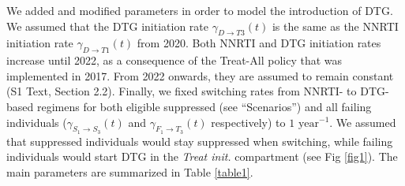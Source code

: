 \documentclass[10pt,letterpaper]{article}
\begin{document}
We added and modified parameters in order to model the introduction of DTG. We assumed that the DTG initiation rate $\gamma_{D\rightarrow T3}^{}(t)$ is the same as the NNRTI initiation rate $\gamma_{D\rightarrow T1}^{}(t)$ from 2020. Both NNRTI and DTG initiation rates increase until 2022, as a consequence of the Treat-All policy that was implemented in 2017. From 2022 onwards, they are assumed to remain constant (S1 Text, Section 2.2). Finally, we fixed switching rates from NNRTI- to DTG-based regimens for both eligible suppressed (see “Scenarios”) and all failing individuals ($\gamma_{S_1\rightarrow S_3}^{}(t)$ and $\gamma_{F_1\rightarrow T_3}^{}(t)$ respectively) to $1\text{ year}^{-1}$. We assumed that suppressed individuals would stay suppressed when switching, while failing individuals would start DTG in the \textit{Treat init.} compartment (see Fig \ref{fig1}). The main parameters are summarized in Table \ref{table1}.

\newcolumntype{b}{X}
\newcommand{\heading}[1]{\multicolumn{1}{c}{#1}}
\newcommand\Tstrut{\rule{0pt}{2.8ex}}         %
\newcommand\Bstrut{\rule[-1ex]{0pt}{0pt}}
\end{document}
